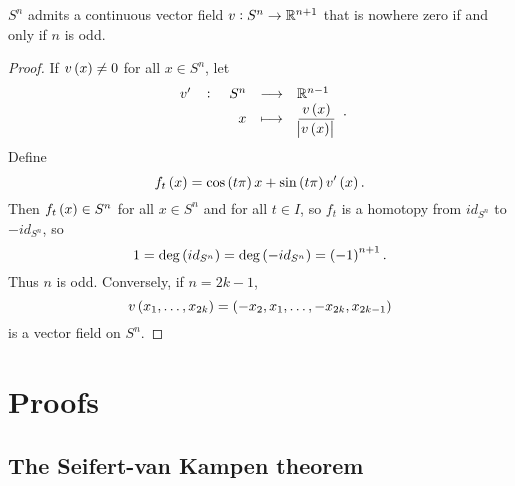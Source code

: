 \begin{theorem}
$ S^n $ admits a continuous vector field $ v : S^n \to \mathbb{R}^{n + 1} $ that is nowhere zero if and only if $ n $ is odd.
\end{theorem}

\begin{proof}
If $ v\br{x} \ne 0 $ for all $ x \in S^n $, let
$$ \function[v']{S^n}{\R^{n - 1}}{x}{\dfrac{v\br{x}}{\abs{v\br{x}}}}. $$
Define
$$ f_t\br{x} = \cos\br{t\pi}x + \sin\br{t\pi}v'\br{x}. $$
Then $ f_t\br{x} \in S^n $ for all $ x \in S^n $ and for all $ t \in I $, so $ f_t $ is a homotopy from $ id_{S^n} $ to $ -id_{S^n} $, so
$$ 1 = \deg\br{id_{S^n}} = \deg\br{-id_{S^n}} = \br{-1}^{n + 1}. $$
Thus $ n $ is odd. Conversely, if $ n = 2k - 1 $,
$$ v\br{x_1, \dots, x_{2k}} = \br{-x_2, x_1, \dots, -x_{2k}, x_{2k - 1}} $$
is a vector field on $ S^n $.
\end{proof}

\pagebreak

\appendix

\section{Proofs}

\subsection{The Seifert-van Kampen theorem}

